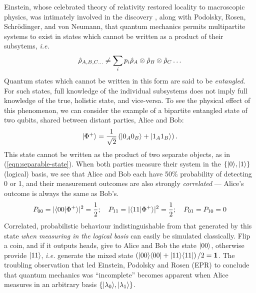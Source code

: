 Einstein, whose celebrated theory of relativity restored locality to macroscopic physics, was intimately involved in the discovery \cite{Einstein1935}, along with Podolsky, Rosen, Schr\"odinger, and von Neumann, that quantum mechanics permits multipartite systems to exist in states which cannot be written as a product of their subsytems, \emph{i.e.}
\begin{equation}
\hat{\rho}_{A,B,C\ldots} \ne \sum_i p_i \hat{\rho}_A \otimes \hat{\rho}_B \otimes \hat{\rho}_C \ldots
\label{eqn:separable-state}
\end{equation}
Quantum states which cannot be written in this form are said to be \emph{entangled}. For such states, full knowledge of the individual subsystems does not imply full knowledge of the true, holistic state, and vice-versa. To see the physical effect of this phenomenon, we can consider the example of a bipartite entangled state of two qubits, shared between distant parties, Alice and Bob:
\begin{equation}
\mbox{$ | \Phi^+ \rangle $} = \frac{1}{\sqrt{2}} \left( \mbox{$ | 0_A 0_B \rangle $} + \mbox{$ | 1_A 1_B \rangle $} \right).
\end{equation}
 This state cannot be written as the product of two separate objects, as in (\ref{eqn:separable-state}). When both parties measure their system in the $\{ \mbox{$ | 0 \rangle $}, \mbox{$ | 1 \rangle $} \}$ (logical) basis, we see that Alice and Bob each have 50\% probability of detecting 0 or 1, and their measurement outcomes are also strongly \emph{correlated} --- Alice's outcome is always the same as Bob's.
\begin{equation}
P_{00} = |\langle 00 | \Phi^+ \rangle|^2 = \frac{1}{2}; ~~~
P_{11} = |\langle 11 | \Phi^+ \rangle|^2 = \frac{1}{2}; ~~~
P_{01}=P_{10} = 0
\end{equation}
Correlated, probabilistic behaviour indistinguishable from that generated by this state \emph{when measuring in the logical basis} can easily be simulated classically. Flip a coin, and if it outputs heads, give to Alice and Bob the state $\mbox{$ | 00 \rangle $}$, otherwise provide $\mbox{$ | 11 \rangle $}$, \emph{i.e.} generate the mixed state $\left(\mbox{$ | 00 \rangle $}\mbox{$ \langle 00 | $} +\mbox{$ | 11 \rangle $}\mbox{$ \langle 11 | $} \right)/2 = \mathbf{1}$. The troubling observation that led Einstein, Podolsky and Rosen (EPR) to conclude that quantum mechanics was ``incomplete'' becomes apparent when Alice measures in an arbitrary basis $\{ \mbox{$ | \lambda_0 \rangle $}, \mbox{$ | \lambda_1 \rangle $} \}$.  

